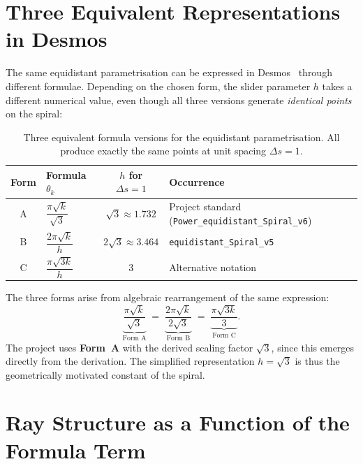 \section{Three Equivalent Representations in Desmos}

The same equidistant parametrisation can be expressed in
Desmos~\cite{Desmos2024} through different formulae. Depending on the
chosen form, the slider parameter $h$ takes a different numerical value,
even though all three versions generate \emph{identical points} on the spiral:

\begin{table}[H]
\centering
\renewcommand{\arraystretch}{1.4}
\caption{Three equivalent formula versions for the equidistant parametrisation.
  All produce exactly the same points at unit spacing $\Delta s=1$.}
\begin{tabular}{clcl}
\toprule
Form & Formula $\theta_k$ & $h$ for $\Delta s=1$ & Occurrence \\
\midrule
A & $\dfrac{\pi\sqrt{k}}{\sqrt{3}}$
  & $\sqrt{3} \approx 1.732$
  & Project standard {\small(\texttt{Power\_equidistant\_Spiral\_v6})} \\[8pt]
B & $\dfrac{2\pi\sqrt{k}}{h}$
  & $2\sqrt{3} \approx 3.464$
  & {\small\texttt{equidistant\_Spiral\_v5}} \\[8pt]
C & $\dfrac{\pi\sqrt{3k}}{h}$
  & $3$
  & Alternative notation \\
\bottomrule
\end{tabular}
\end{table}

\begin{bemerkung}
The three forms arise from algebraic rearrangement of the same expression:
\[
  \underbrace{\frac{\pi\sqrt{k}}{\sqrt{3}}}_{\text{Form A}}
  \;=\; \underbrace{\frac{2\pi\sqrt{k}}{2\sqrt{3}}}_{\text{Form B}}
  \;=\; \underbrace{\frac{\pi\sqrt{3k}}{3}}_{\text{Form C}}.
\]
The project uses \textbf{Form~A} with the derived scaling factor
$\sqrt{3}$, since this emerges directly from the derivation. The
simplified representation $h = \sqrt{3}$ is thus the geometrically
motivated constant of the spiral.
\end{bemerkung}

\section{Ray Structure as a Function of the Formula Term}

